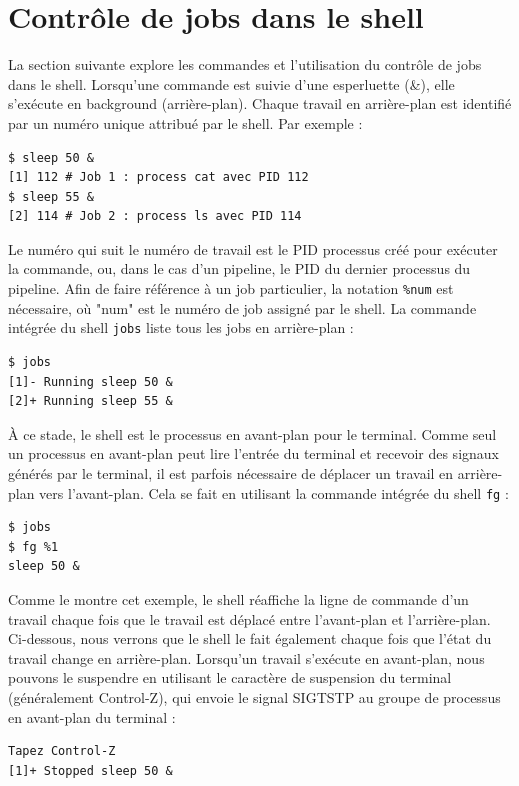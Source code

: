 \section{Contrôle de jobs dans le shell}
La section suivante explore les commandes et l'utilisation du contrôle de jobs dans le shell. 
\newline
\newline
Lorsqu'une commande est suivie d'une esperluette (\&), elle s'exécute en background (arrière-plan). 
Chaque travail en arrière-plan est identifié par un numéro unique attribué par le shell. Par exemple :

\begin{lstlisting}[style=blackstyle]
$ sleep 50 & 
[1] 112	# Job 1 : process cat avec PID 112
$ sleep 55 &
[2] 114	# Job 2 : process ls avec PID 114
\end{lstlisting}
Le numéro qui suit le numéro de travail est le PID processus créé pour exécuter la commande, ou, dans le cas d'un pipeline, le PID du dernier processus du pipeline. Afin de faire référence à un job particulier, la notation \verb|%num| est nécessaire, où "num" est le numéro de job assigné par le shell.
\newline
\newline
La commande intégrée du shell \texttt{jobs} liste tous les jobs en arrière-plan :
\begin{lstlisting}[style=blackstyle]
$ jobs
[1]- Running sleep 50 & 
[2]+ Running sleep 55 &
\end{lstlisting}

À ce stade, le shell est le processus en avant-plan pour le terminal. Comme seul un processus en avant-plan peut lire l'entrée du terminal et recevoir 
des signaux générés par le terminal, il est parfois nécessaire de déplacer un travail en arrière-plan vers l'avant-plan. 
Cela se fait en utilisant la commande intégrée du shell \texttt{fg} :
\begin{lstlisting}[style=blackstyle]
$ jobs
$ fg %1
sleep 50 & 
\end{lstlisting}

Comme le montre cet exemple, le shell réaffiche la ligne de commande d'un travail chaque fois que le travail est déplacé entre l'avant-plan 
et l'arrière-plan. Ci-dessous, nous verrons que le shell le fait également chaque fois que l'état du travail change en arrière-plan.
\newline
Lorsqu'un travail s'exécute en avant-plan, nous pouvons le suspendre en utilisant le caractère de suspension du terminal 
(généralement Control-Z), qui envoie le signal SIGTSTP au groupe de processus en avant-plan du terminal :
\begin{lstlisting}[style=blackstyle]
Tapez Control-Z
[1]+ Stopped sleep 50 & 
\end{lstlisting}

